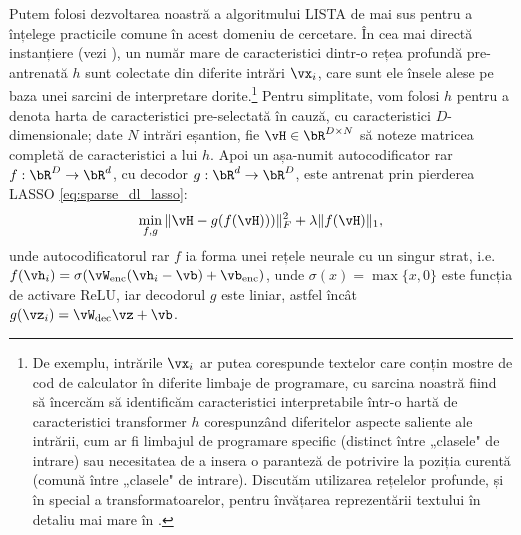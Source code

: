 \documentclass[../../book-main_ro.tex]{subfiles}
\begin{document}
Putem folosi dezvoltarea noastră a algoritmului LISTA de mai sus pentru a înțelege practicile
comune în acest domeniu de cercetare.
În cea mai directă instanțiere (vezi \citep{huben2024sparse,
gao2025scaling}), un număr mare de caracteristici dintr-o rețea profundă pre-antrenată $h$
sunt colectate din diferite intrări $\vx_i$, care sunt ele însele alese pe baza
unei sarcini de interpretare dorite.\footnote{De exemplu, intrările $\vx_i$ ar putea
corespunde textelor care conțin mostre de cod de calculator în diferite limbaje
de programare, cu sarcina noastră fiind să încercăm să identificăm caracteristici interpretabile într-o
hartă de caracteristici transformer $h$ corespunzând diferitelor aspecte saliente ale
intrării, cum ar fi limbajul de programare specific (distinct între „clasele"
de intrare) sau necesitatea de a insera o paranteză de potrivire la poziția
curentă (comună între „clasele" de intrare). Discutăm utilizarea rețelelor profunde,
și în special a transformatoarelor, pentru învățarea reprezentării
textului în detaliu mai mare în .} Pentru
simplitate, vom folosi $h$ pentru a denota harta de caracteristici pre-selectată în cauză,
cu caracteristici $D$-dimensionale; date $N$ intrări eșantion, fie $\vH \in \bR^{D
\times N}$ să noteze matricea completă de caracteristici a lui $h$.
Apoi un așa-numit autocodificator rar $f : \bR^D \to \bR^d$, cu decodor $g : \bR^d \to
\bR^D$, este antrenat prin pierderea LASSO \eqref{eq:sparse_dl_lasso}:
\begin{equation}\label{eq:sae-loss}
  \min_{f, g} \| \vH - g(f(\vH))) \|_F^2 + \lambda \|f(\vH)\|_1 ,
\end{equation}
unde autocodificatorul rar $f$ ia forma unei rețele neurale cu un singur strat,
i.e.\ $f(\vh_i) = \sigma(\vW_{\mathrm{enc}}(\vh_i - \vb)
+ \vb_{\mathrm{enc}})$, unde $\sigma(x) = \max \{x, 0\}$ este funcția de
activare ReLU, iar decodorul $g$ este liniar, astfel încât $g(\vz_i)
= \vW_{\mathrm{dec}}\vz + \vb$.
\end{document}
